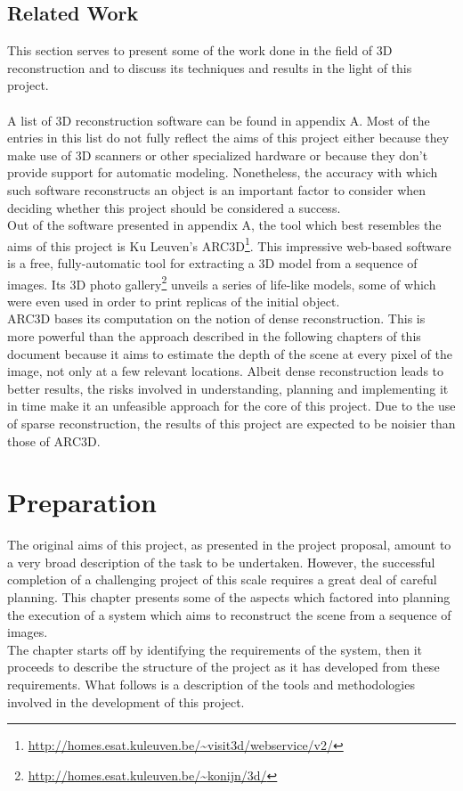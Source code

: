 \documentclass[12pt,a4paper,twoside,openright]{report}
\begin{document}
\section{Related Work}
This section serves to present some of the work done in the field of 3D reconstruction and to discuss its techniques and results in the light of this project.\\
   \\
\linebreak
A list of 3D reconstruction software can be found in appendix A. Most of the entries in this list do not fully reflect the aims of this project either because they make use of 3D scanners or other specialized hardware or because they don't provide support for automatic modeling. Nonetheless, the accuracy with which such software reconstructs an object is an important factor to consider when deciding whether this project should be considered a success.\\
\linebreak
Out of the software presented in appendix A, the tool which best resembles the aims of this project is Ku Leuven's ARC3D\footnote{\url{http://homes.esat.kuleuven.be/~visit3d/webservice/v2/}}. This impressive web-based software is a free, fully-automatic tool for extracting a 3D model from a sequence of images. Its 3D photo gallery\footnote{\url{http://homes.esat.kuleuven.be/~konijn/3d/}} unveils a series of life-like models, some of which were even used in order to print replicas of the initial object.\\
\linebreak
ARC3D bases its computation on the notion of dense reconstruction\cite{tingdahl_lncs_11}. This is more powerful than the approach described in the following chapters of this document because it aims to estimate the depth of the scene at every pixel of the image, not only at a few relevant locations. Albeit dense reconstruction leads to better results, the risks involved in understanding, planning and implementing it in time make it an unfeasible approach for the core of this project. Due to the use of sparse reconstruction, the results of this project are expected to be noisier than those of ARC3D. 


\chapter{Preparation}
The original aims of this project, as presented in the project proposal, amount to a very broad description of the task to be undertaken. However, the successful completion of a challenging project of this scale requires a great deal of careful planning. This chapter presents some of the aspects which factored into planning the execution of a system which aims to reconstruct the scene from a sequence of images.\\
\linebreak
The chapter starts off by identifying the requirements of the system, then it proceeds to describe the structure of the project as it has developed from these requirements. What follows is a description of the tools and methodologies involved in the development of this project. 
\end{document}
